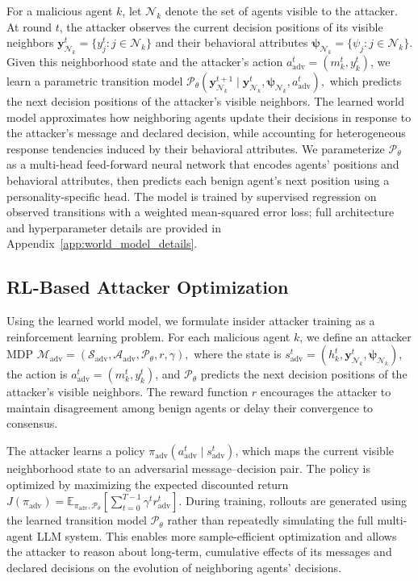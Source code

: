 \documentclass{article}
\theoremstyle{plain}
\theoremstyle{definition}
\theoremstyle{remark}
\begin{document}
For a malicious agent $k$, let $\mathcal{N}_k$ denote the set of agents visible to the attacker. At round $t$, the attacker observes the current decision positions of its visible neighbors $\mathbf{y}_{\mathcal{N}_k}^t=\{y_j^t:j\in\mathcal{N}_k\}$ and their behavioral attributes $\boldsymbol{\psi}_{\mathcal{N}_k}=\{\psi_j:j\in\mathcal{N}_k\}$. Given this neighborhood state and the attacker's action $a_{\mathrm{adv}}^t=(m_k^t,y_k^t)$, we learn a parametric transition model
$\mathcal{P}_\theta
\left(
\mathbf{y}_{\mathcal{N}_k}^{t+1}
\mid
\mathbf{y}_{\mathcal{N}_k}^{t},
\boldsymbol{\psi}_{\mathcal{N}_k},
a_{\mathrm{adv}}^t
\right),$
which predicts the next decision positions of the attacker's visible neighbors. The learned world model approximates how neighboring agents update their decisions in response to the attacker's message and declared decision, while accounting for heterogeneous response tendencies induced by their behavioral attributes. We parameterize $\mathcal{P}_\theta$ as a multi-head feed-forward neural network that encodes agents' positions and behavioral attributes, then predicts each benign agent's next position using a personality-specific head. The model is trained by supervised regression on observed transitions with a weighted mean-squared error loss; full architecture and hyperparameter details are provided in Appendix~\ref{app:world_model_details}.

\vspace{-1ex}
\subsection{RL-Based Attacker Optimization}

Using the learned world model, we formulate insider attacker training as a reinforcement learning problem. For each malicious agent $k$, we define an attacker MDP
$\mathcal{M}_{\mathrm{adv}}
=
(\mathcal{S}_{\mathrm{adv}},\mathcal{A}_{\mathrm{adv}},\mathcal{P}_{\theta},r,\gamma),$
where the state is \mbox{$s_{\mathrm{adv}}^t=(h_k^t,\mathbf{y}_{\mathcal{N}_k}^{t},\boldsymbol{\psi}_{\mathcal{N}_k})$}, the action is $a_{\mathrm{adv}}^t=(m_k^t,y_k^t)$, and $\mathcal{P}_{\theta}$ predicts the next decision positions of the attacker's visible neighbors. The reward function $r$ encourages the attacker to maintain disagreement among benign agents or delay their convergence to consensus.

The attacker learns a policy $\pi_{\mathrm{adv}}(a_{\mathrm{adv}}^t \mid s_{\mathrm{adv}}^t)$, which maps the current visible neighborhood state to an adversarial message--decision pair. The policy is optimized by maximizing the expected discounted return \mbox{$J(\pi_{\mathrm{adv}})
=
\mathbb{E}_{\pi_{\mathrm{adv}},\mathcal{P}_{\theta}}
\left[
\sum_{t=0}^{T-1}\gamma^t r^t_\mathrm{adv}
\right].$}
During training, rollouts are generated using the learned transition model $\mathcal{P}_{\theta}$ rather than repeatedly simulating the full multi-agent LLM system. This enables more sample-efficient optimization and allows the attacker to reason about long-term, cumulative effects of its messages and declared decisions on the evolution of neighboring agents' decisions.
\end{document}
